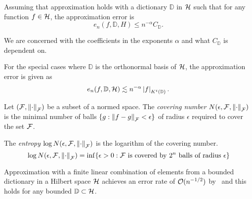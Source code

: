 Assuming that approximation holds with a dictionary $\mathbb{D}$ in $\mathcal{H}$
such that for any function $f \in \mathcal{H}$, the approximation error is
\begin{equation}
    \label{eq:appro_error_general}
    e_n(f, \mathbb{D}, H) \leq n^{-\alpha} C_{\mathbb{D}}.
\end{equation}

We are concerned with the coefficients in the exponents $\alpha$ and what
$C_{\mathbb{D}}$ is dependent on.

For the special cases where $\mathbb{D}$ is the orthonormal basis of $\mathcal{H}$,
the approximation error is given as
\begin{equation}
    \label{eq:appro_error_ortho}
    e_n(f, \mathbb{D}, \mathcal{H}) 
        \lesssim n^{-\alpha} \left| f \right|_{K^t(\mathbb{D})}.
\end{equation}

\begin{definition}
    \label{def:covering_num}
    Let $(\mathcal{F}, \left\| \cdot \right\|_{\mathcal{F}})$ be a subset of a normed space. The
    \textit{covering number} $N(\epsilon, \mathcal{F}, \left\| \cdot \right\|_{\mathcal{F}})$ is
    the minimal number of balls $\{g: \left\| f - g \right\|_{\mathcal{F}} < \epsilon\}$ of
    radius $\epsilon$ required to cover the set $\mathcal{F}$. 
\end{definition}

\begin{definition}[Entropy]
    \label{def:entropy} The \textit{entropy} $\log N(\epsilon, \mathcal{F},
    \left\| \cdot \right\|_{\mathcal{F}})$ is the logarithm of the covering number.
    \begin{equation}
        \log N(\epsilon, \mathcal{F}, \left\| \cdot \right\|_{\mathcal{F}})
        = \inf \{
            \epsilon > 0: \mathcal{F} \text{ is covered by } 2^n 
            \text{ balls of radius } \epsilon
        \}
    \end{equation}
\end{definition}

Approximation with a finite linear combination of elements from a bounded
dictionary in a Hilbert space $\mathcal{H}$ achieves an error rate of
$\mathcal{O}(n^{-1/2})$ by~\cite{pisierRemarquesResultatNon1980} and this holds for
any bounded $\mathbb{D} \subset \mathcal{H}$.


